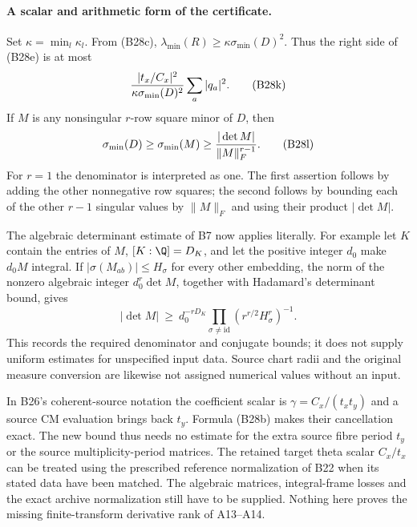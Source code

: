\paragraph{A scalar and arithmetic form of the certificate.}
Set $\kappa=\min_l\kappa_l$.  From (B28c),
$\lambda_{\min}(R)\geq\kappa\sigma_{\min}(D)^2$.
Thus the right side of (B28e) is at most
\[
       {|t_x/C_x|^2\over\kappa\sigma_{\min}(D)^2}
                          \sum_a|q_a|^2.
 \tag{B28k}
\]
If $M$ is any nonsingular $r$-row square minor of $D$,
then
\[
 \sigma_{\min}(D)\geq\sigma_{\min}(M)
              \geq { |\det M|\over\|M\|_F^{r-1}}.
 \tag{B28l}
\]
For $r=1$ the denominator is interpreted as one.  The
first assertion follows by adding the other nonnegative
row squares; the second follows by bounding each of the
other $r-1$ singular values by $\|M\|_F$ and using their
product $|\det M|$.

The algebraic determinant estimate of B7 now applies
literally.  For example let $K$ contain the entries of $M$,
$[K:\Q]=D_K$, and let the positive integer $d_0$ make
$d_0M$ integral.  If
$|\sigma(M_{ab})|\leq H_\sigma$ for every other embedding,
the norm of the nonzero algebraic integer
$d_0^r\det M$, together with Hadamard's determinant bound,
gives
\[
 |\det M|\ \geq\ d_0^{-rD_K}
       \prod_{\sigma\ne\mathrm{id}}
                      (r^{r/2}H_\sigma^r)^{-1}.
 \tag{B28m}
\]
This records the required denominator and conjugate bounds;
it does not supply uniform estimates for unspecified input
data.  Source chart radii and the original measure conversion
are likewise not assigned numerical values without an input.

In B26's coherent-source notation the coefficient scalar is
$\gamma=C_x/(t_xt_y)$ and a source CM evaluation brings back
$t_y$.  Formula (B28b) makes their cancellation exact.  The
new bound thus needs no estimate for the extra source fibre
period $t_y$ or the source multiplicity-period matrices.
The retained target theta scalar $C_x/t_x$ can be treated
using the prescribed reference normalization of B22 when
its stated data have been matched.  The algebraic matrices,
integral-frame losses and the exact archive normalization
still have to be supplied.  Nothing here proves the missing
finite-transform derivative rank of A13--A14.

